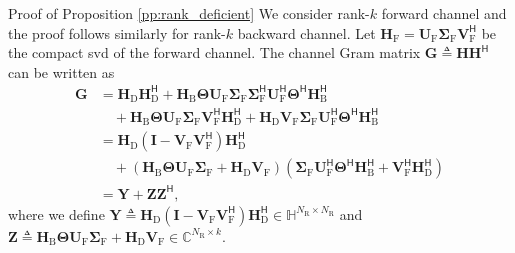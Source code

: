 \documentclass[journal]{IEEEtran}
\begin{document}
\begin{appendix}
	\begin{subsection}{Proof of Proposition \ref{pp:rank_deficient}}\label{ap:rank_deficient}
		We consider rank-$k$ forward channel and the proof follows similarly for rank-$k$ backward channel.
		Let $\mathbf{H}_\mathrm{F} = \mathbf{U}_\mathrm{F} \mathbf{\Sigma}_\mathrm{F} \mathbf{V}_\mathrm{F}^\mathsf{H}$ be the compact \gls{svd} of the forward channel.
		The channel Gram matrix $\mathbf{G} \triangleq \mathbf{H} \mathbf{H}^\mathsf{H} $ can be written as
		\begin{equation*}
			\begin{split}
				\mathbf{G}
				 & = \mathbf{H}_\mathrm{D} \mathbf{H}_\mathrm{D}^\mathsf{H} + \mathbf{H}_\mathrm{B} \mathbf{\Theta} \mathbf{U}_\mathrm{F} \mathbf{\Sigma}_\mathrm{F} \mathbf{\Sigma}_\mathrm{F}^\mathsf{H} \mathbf{U}_\mathrm{F}^\mathsf{H} \mathbf{\Theta}^\mathsf{H} \mathbf{H}_\mathrm{B}^\mathsf{H}                                                         \\
				 & \quad + \mathbf{H}_\mathrm{B} \mathbf{\Theta} \mathbf{U}_\mathrm{F} \mathbf{\Sigma}_\mathrm{F} \mathbf{V}_\mathrm{F}^\mathsf{H} \mathbf{H}_\mathrm{D}^\mathsf{H} + \mathbf{H}_\mathrm{D} \mathbf{V}_\mathrm{F} \mathbf{\Sigma}_\mathrm{F} \mathbf{U}_\mathrm{F}^\mathsf{H} \mathbf{\Theta}^\mathsf{H} \mathbf{H}_\mathrm{B}^\mathsf{H}       \\
				 & = \mathbf{H}_\mathrm{D} (\mathbf{I} - \mathbf{V}_\mathrm{F} \mathbf{V}_\mathrm{F}^\mathsf{H}) \mathbf{H}_\mathrm{D}^\mathsf{H}                                                                                                                                                                                                               \\
				 & \quad + (\mathbf{H}_\mathrm{B} \mathbf{\Theta} \mathbf{U}_\mathrm{F} \mathbf{\Sigma}_\mathrm{F} + \mathbf{H}_\mathrm{D} \mathbf{V}_\mathrm{F}) (\mathbf{\Sigma}_\mathrm{F} \mathbf{U}_\mathrm{F}^\mathsf{H} \mathbf{\Theta}^\mathsf{H} \mathbf{H}_\mathrm{B}^\mathsf{H} + \mathbf{V}_\mathrm{F}^\mathsf{H} \mathbf{H}_\mathrm{D}^\mathsf{H}) \\
				 & = \mathbf{Y} + \mathbf{Z} \mathbf{Z}^\mathsf{H},
			\end{split}
		\end{equation*}
		where we define $\mathbf{Y} \triangleq \mathbf{H}_\mathrm{D} (\mathbf{I} - \mathbf{V}_\mathrm{F} \mathbf{V}_\mathrm{F}^\mathsf{H}) \mathbf{H}_\mathrm{D}^\mathsf{H} \in \mathbb{H}^{N_\mathrm{R} \times N_\mathrm{R}}$ and $\mathbf{Z} \triangleq \mathbf{H}_\mathrm{B} \mathbf{\Theta} \mathbf{U}_\mathrm{F} \mathbf{\Sigma}_\mathrm{F} + \mathbf{H}_\mathrm{D} \mathbf{V}_\mathrm{F} \in \mathbb{C}^{N_\mathrm{R} \times k}$.

\end{subsection}
\end{appendix}
\end{document}

